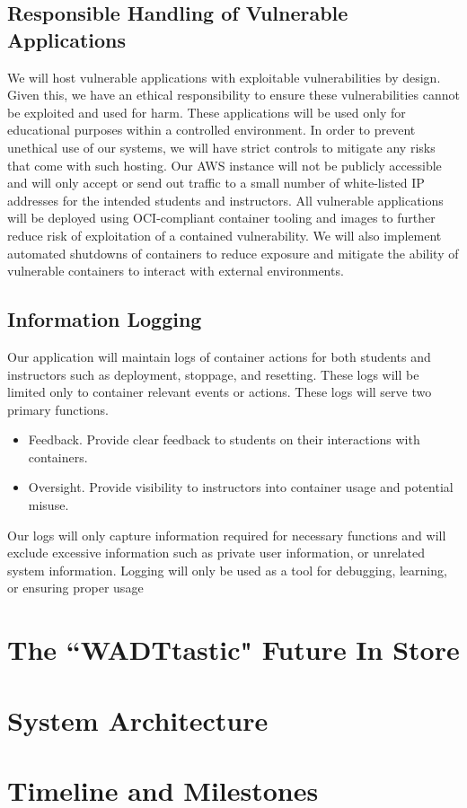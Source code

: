 \documentclass[12pt]{article}
\begin{document}
\subsection{Responsible Handling of Vulnerable Applications}
We will host vulnerable applications with exploitable vulnerabilities by design. Given this, we have an ethical responsibility to ensure these vulnerabilities cannot be exploited and used for harm. These applications will be used only for educational purposes within a controlled environment. In order to prevent unethical use of our systems, we will have strict controls to mitigate any risks that come with such hosting. Our AWS instance will not be publicly accessible and will only accept or send out traffic to a small number of white-listed IP addresses for the intended students and instructors. All vulnerable applications will be deployed using OCI-compliant container tooling and images to further reduce risk of exploitation of a contained vulnerability. We will also implement automated shutdowns of containers to reduce exposure and mitigate the ability of vulnerable containers to interact with external environments.


\subsection{Information Logging}
Our application will maintain logs of container actions for both students and instructors such as deployment, stoppage, and resetting. These logs will be limited only to container relevant events or actions. These logs will serve two primary functions.
\begin{itemize}
	\item Feedback. Provide clear feedback to students on their interactions with containers.
	\item Oversight. Provide visibility to instructors into container usage and potential misuse.
\end{itemize}

Our logs will only capture information required for necessary functions and will exclude excessive information such as private user information, or unrelated system information. Logging will only be used as a tool for debugging, learning, or ensuring proper usage

\section{The ``WADTtastic" Future In Store}



\section{System Architecture}


\section{Timeline and Milestones}
\end{document}
